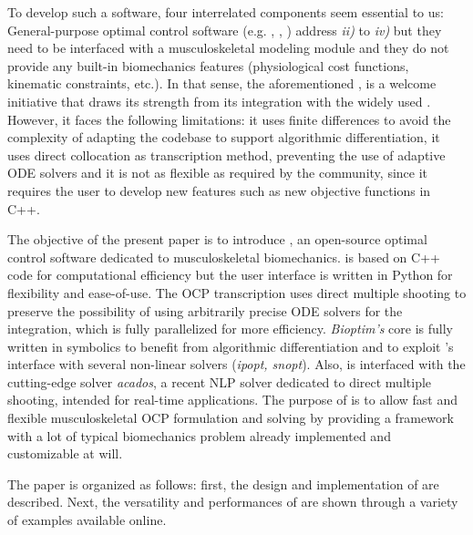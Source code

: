 To develop such a software, four interrelated components seem essential to us:  
General-purpose optimal control software (e.g. \gpopsii [\addref], \muscodii [\addref], \acado [\addref]) address \textit{ii)} to \textit{iv)} but they need to be interfaced with a musculoskeletal modeling module and they do not provide any built-in biomechanics features (physiological cost functions, kinematic constraints, etc.). 
In that sense, the aforementioned \moco, is a welcome initiative that draws its strength from its integration with the widely used \opensim.
However, it faces the following limitations: it uses finite differences to avoid the complexity of adapting the \opensim codebase to support algorithmic differentiation, it uses direct collocation as transcription method, preventing the use of adaptive ODE solvers and it is not as flexible as required by the community, since it requires the user to develop new features such as new objective functions in C++. 

The objective of the present paper is to introduce \bioptim, an open-source optimal control software dedicated to musculoskeletal biomechanics.
\bioptim is based on C++ code for computational efficiency but the user interface is written in Python for flexibility and ease-of-use. 
The OCP transcription uses direct multiple shooting to preserve the possibility of using arbitrarily precise ODE solvers for the integration, which is fully parallelized for more efficiency.
\textit{Bioptim's} core is fully written in \casadi symbolics to benefit from algorithmic differentiation and to exploit \casadi 's interface with several non-linear solvers (\textit{ipopt, snopt}).
Also, \bioptim is interfaced with the cutting-edge solver \textit{acados}, a recent NLP solver dedicated to direct multiple shooting, intended for real-time applications.
The purpose of \bioptim is to allow fast and flexible musculoskeletal OCP formulation and solving by providing a framework with a lot of typical biomechanics problem already implemented and customizable at will.

The paper is organized as follows: first, the design and implementation of \bioptim are described.
Next, the versatility and performances of \bioptim are shown through a variety of examples available online. 
